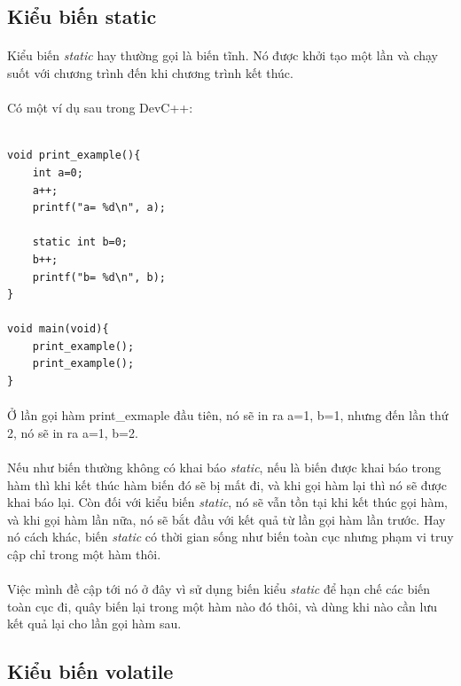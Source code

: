 \documentclass[12pt,a5paper]{book}
\begin{document}
\subsection{Kiểu biến static}
\paragraph{}
Kiểu biến \textit{static} hay thường gọi là biến tĩnh. Nó được khởi tạo một lần và chạy suốt với chương trình đến khi chương trình kết thúc.
\paragraph{}
Có một ví dụ sau trong DevC++:
\begin{lstlisting}

void print_example(){
	int a=0;
	a++;
	printf("a= %d\n", a);
	
	static int b=0;
	b++;
	printf("b= %d\n", b);
}

void main(void){
	print_example();
	print_example();
}

\end{lstlisting}
\paragraph{}
Ở lần gọi hàm print\_exmaple đầu tiên, nó sẽ in ra a=1, b=1, nhưng đến lần thứ 2, nó sẽ in ra a=1, b=2. 
\paragraph{}
Nếu như biến thường không có khai báo \textit{static}, nếu là biến được khai báo trong hàm thì khi kết thúc hàm biến đó sẽ bị mất đi, và khi gọi hàm lại thì nó sẽ được khai báo lại. Còn đối với kiểu biến
\textit{static}, nó sẽ vẫn tồn tại khi kết thúc gọi hàm, và khi gọi hàm lần nữa, nó sẽ bắt đầu với kết quả từ lần gọi hàm lần trước. Hay nó cách khác, biến \textit{static} có thời gian sống như biến toàn cục nhưng phạm vi truy cập chỉ trong một hàm thôi. 
\paragraph{}
Việc mình đề cập tới nó ở đây vì sử dụng biến kiểu \textit{static} để hạn chế các biến toàn cục đi, quây biến lại trong một hàm nào đó thôi, và dùng khi nào cần lưu kết quả lại cho lần gọi hàm sau.
\subsection{Kiểu biến volatile}
\end{document}
